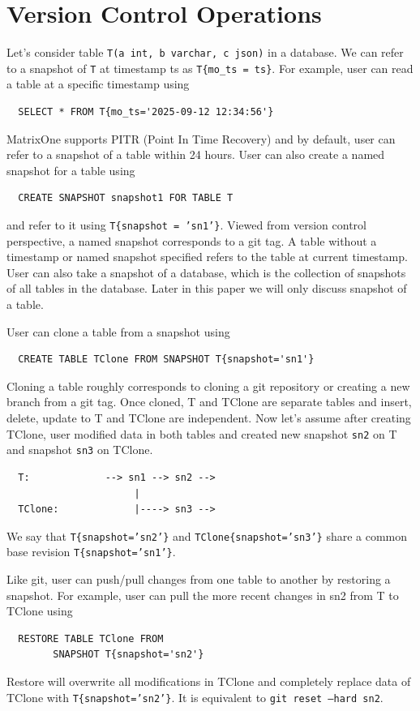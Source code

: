 \documentclass[sigconf,nonacm]{acmart} %
\begin{document}
\section{Version Control Operations}\label{sec:vcop}
Let's consider table \texttt{T(a int, b varchar, c json)} in a database.  
We can refer to a snapshot of \texttt{T} at timestamp
ts as \texttt{T\{mo\_ts = ts\}}.  For example, user can read a table at a specific
timestamp using 
\begin{verbatim}
  SELECT * FROM T{mo_ts='2025-09-12 12:34:56'}
\end{verbatim}
MatrixOne supports PITR (Point In Time Recovery) and by default, user can refer
to a snapshot of a table within 24 hours.  User can also create a named snapshot
for a table using 
\begin{verbatim}
  CREATE SNAPSHOT snapshot1 FOR TABLE T
\end{verbatim}  
and refer to it using \texttt{T\{snapshot = 'sn1'\}}.  
Viewed from version control perspective, a named snapshot corresponds to a git tag.
A table without a timestamp or named snapshot specified refers to the table
at current timestamp.
User can also take a snapshot of a database, which is the collection of snapshots 
of all tables in the database.  Later in this paper we will only discuss 
snapshot of a table.

User can clone a table from a snapshot using 
\begin{verbatim}
  CREATE TABLE TClone FROM SNAPSHOT T{snapshot='sn1'}
\end{verbatim}
Cloning a table roughly corresponds to cloning a git repository or
creating a new branch from a git tag.  Once cloned, T and TClone are 
separate tables and insert, delete, update to T and TClone are 
independent.  Now let's assume after creating TClone, user modified data
in both tables and created new snapshot \texttt{sn2} on T and snapshot \texttt{sn3} on TClone. 
\begin{verbatim}
  T:             --> sn1 --> sn2 --> 
                      |
  TClone:             |----> sn3 --> 
\end{verbatim}
We say that \texttt{T\{snapshot='sn2'\}} and \texttt{TClone\{snapshot='sn3'\}} 
share a common base revision \texttt{T\{snapshot='sn1'\}}.

Like git, user can push/pull changes from one table to another by 
restoring a snapshot.  For example, user can pull the more recent 
changes in sn2 from T to TClone using \begin{verbatim}
  RESTORE TABLE TClone FROM
        SNAPSHOT T{snapshot='sn2'}
\end{verbatim}
Restore will overwrite all modifications in TClone and completely replace 
data of TClone with \texttt{T\{snapshot='sn2'\}}.  It is equivalent to 
\texttt{git reset --hard sn2}.
\end{document}
